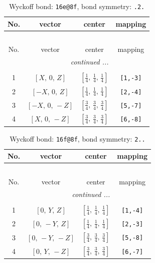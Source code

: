 \documentclass[fleqn,8pt]{jsarticle}
\begin{document}
\renewcommand{\arraystretch}{1.2}
\begin{longtable}{cccc}
\caption{Wyckoff bond: {\tt 16e@8f}, bond symmetry: {\tt .2.}}
 \\
 \hline \hline
No. & vector & center & mapping \\ \hline \endfirsthead

\multicolumn{3}{l}{\tablename\ \thetable{}} \\
 \hline \hline
No. & vector & center & mapping \\ \hline \endhead

 \hline \hline
\multicolumn{3}{r}{\footnotesize\it continued ...} \\ \endfoot

 \hline \hline
\multicolumn{3}{r}{} \\ \endlastfoot

1 & $\left[ X,\, 0,\, Z \right]$ & $\left[ \frac{1}{4},\, \frac{1}{4},\, \frac{1}{4} \right]$ & {\tt [1,-3]} \\ \hline
2 & $\left[ - X,\, 0,\, Z \right]$ & $\left[ \frac{1}{4},\, \frac{1}{4},\, \frac{1}{4} \right]$ & {\tt [2,-4]} \\ \hline
3 & $\left[ - X,\, 0,\, - Z \right]$ & $\left[ \frac{3}{4},\, \frac{3}{4},\, \frac{3}{4} \right]$ & {\tt [5,-7]} \\ \hline
4 & $\left[ X,\, 0,\, - Z \right]$ & $\left[ \frac{3}{4},\, \frac{3}{4},\, \frac{3}{4} \right]$ & {\tt [6,-8]} \\
\end{longtable}
\renewcommand{\arraystretch}{1.2}
\begin{longtable}{cccc}
\caption{Wyckoff bond: {\tt 16f@8f}, bond symmetry: {\tt 2..}}
 \\
 \hline \hline
No. & vector & center & mapping \\ \hline \endfirsthead

\multicolumn{3}{l}{\tablename\ \thetable{}} \\
 \hline \hline
No. & vector & center & mapping \\ \hline \endhead

 \hline \hline
\multicolumn{3}{r}{\footnotesize\it continued ...} \\ \endfoot

 \hline \hline
\multicolumn{3}{r}{} \\ \endlastfoot

1 & $\left[ 0,\, Y,\, Z \right]$ & $\left[ \frac{1}{4},\, \frac{1}{4},\, \frac{1}{4} \right]$ & {\tt [1,-4]} \\ \hline
2 & $\left[ 0,\, - Y,\, Z \right]$ & $\left[ \frac{1}{4},\, \frac{1}{4},\, \frac{1}{4} \right]$ & {\tt [2,-3]} \\ \hline
3 & $\left[ 0,\, - Y,\, - Z \right]$ & $\left[ \frac{3}{4},\, \frac{3}{4},\, \frac{3}{4} \right]$ & {\tt [5,-8]} \\ \hline
4 & $\left[ 0,\, Y,\, - Z \right]$ & $\left[ \frac{3}{4},\, \frac{3}{4},\, \frac{3}{4} \right]$ & {\tt [6,-7]} \\
\end{longtable}
\end{document}
